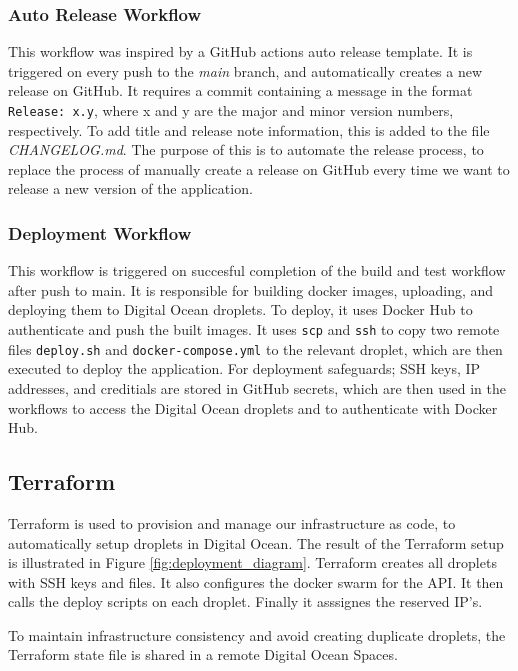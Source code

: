 \subsubsection{Auto Release Workflow}
This workflow was inspired by a GitHub actions auto release template\cite{auto-release}.
It is triggered on every push to the \textit{main} branch, and automatically 
creates a new release on GitHub.
It requires a commit containing a message in the format \texttt{Release: x.y}, 
where x and y are the major and minor version numbers, respectively.
To add title and release note information, this is added to the file \textit{CHANGELOG.md}.
The purpose of this is to automate the release process, to replace the process 
of manually create a release on GitHub every time we want to release a new version 
of the application.

\subsubsection{Deployment Workflow}
This workflow is triggered on succesful completion of the build and test workflow 
after push to main.
It is responsible for building docker images, uploading, and deploying them to 
Digital Ocean droplets.
To deploy, it uses Docker Hub to authenticate and push the built images.
It uses \texttt{scp} and \texttt{ssh} to copy two remote files \texttt{deploy.sh} 
and \texttt{docker-compose.yml} to the relevant droplet,
which are then executed to deploy the application.
For deployment safeguards; SSH keys, IP addresses, and creditials are stored in GitHub secrets,
which are then used in the workflows to access the Digital Ocean droplets and to 
authenticate with Docker Hub.


\subsection{Terraform}
Terraform is used to provision and manage our infrastructure as code, 
to automatically setup droplets in Digital Ocean. 
The result of the Terraform setup is illustrated 
in Figure \ref{fig:deployment_diagram}.
Terraform creates all droplets with SSH keys and files.
It also configures the docker swarm for the API.
It then calls the deploy scripts on each droplet.
Finally it asssignes the reserved IP's.

To maintain infrastructure consistency and avoid creating duplicate droplets,
the Terraform state file is shared in a remote Digital Ocean Spaces.


